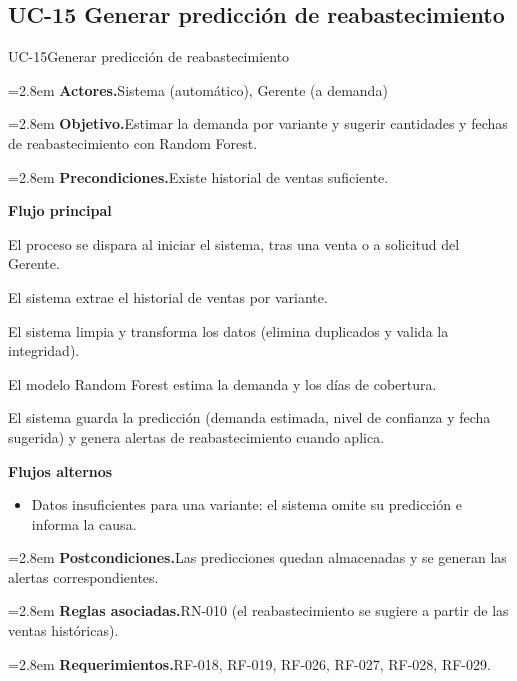 \documentclass[11pt]{article}
\newcommand{\fila}[2]{\par\smallskip\noindent\hangindent=2.8em\hangafter=0
  \textbf{\sffamily\color{brand!80!black}#1.}\hspace{0.4em}#2\par}
\newcommand{\bloque}[1]{\par\smallskip\noindent\textbf{\sffamily\color{brand!80!black}#1}\par\nopagebreak}
\newenvironment{alternos}{\begin{itemize}[leftmargin=2.9em, itemsep=0.2ex, topsep=0.3ex]}{\end{itemize}}
\begin{document}
\subsection{UC-15 Generar predicción de reabastecimiento}
\begin{ficha}{UC-15}{Generar predicción de reabastecimiento}
\fila{Actores}{Sistema (automático), Gerente (a demanda)}
\fila{Objetivo}{Estimar la demanda por variante y sugerir cantidades y fechas de reabastecimiento con Random Forest.}
\fila{Precondiciones}{Existe historial de ventas suficiente.}
\bloque{Flujo principal}
\begin{pasos}
  \item El proceso se dispara al iniciar el sistema, tras una venta o a solicitud del Gerente.
  \item El sistema extrae el historial de ventas por variante.
  \item El sistema limpia y transforma los datos (elimina duplicados y valida la integridad).
  \item El modelo Random Forest estima la demanda y los días de cobertura.
  \item El sistema guarda la predicción (demanda estimada, nivel de confianza y fecha sugerida) y genera alertas de reabastecimiento cuando aplica.
\end{pasos}
\bloque{Flujos alternos}
\begin{alternos}
  \item[\textbf{2a.}] Datos insuficientes para una variante: el sistema omite su predicción e informa la causa.
\end{alternos}
\fila{Postcondiciones}{Las predicciones quedan almacenadas y se generan las alertas correspondientes.}
\fila{Reglas asociadas}{RN-010 (el reabastecimiento se sugiere a partir de las ventas históricas).}
\fila{Requerimientos}{RF-018, RF-019, RF-026, RF-027, RF-028, RF-029.}
\end{ficha}
\end{document}
